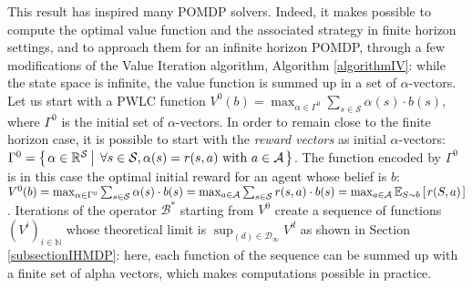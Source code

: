 This result has inspired many POMDP solvers.
Indeed, it makes possible to compute the optimal value function and the associated strategy
in finite horizon settings, and to approach them for an infinite horizon POMDP,
through a few modifications of the Value Iteration algorithm, Algorithm \ref{algorithmIV}: 
while the state space is infinite, the value function is summed up in a set of $\alpha$-vectors.
Let us start with a PWLC function $V^0(b)= \displaystyle\max_{\alpha \in \Gamma^0} \sum_{s \in \mathcal{S}} \alpha(s) \cdot b(s)$,
where $\Gamma^0$ is the initial set of $\alpha$-vectors.
In order to remain close to the finite horizon case,
it is possible to start with the \textit{reward vectors} as initial $\alpha$-vectors:
$\Gamma^0 = \left\{ \left.  \alpha \in \mathbb{R}^{\mathcal{S}} \, \right| \left. \, \forall s \in \mathcal{S}, \alpha(s) = r(s,a) \mbox{ with } a \in \mathcal{A}  \right. \right\}$.
The function encoded by $\Gamma^0$ is in this case the optimal initial reward 
for an agent whose belief is $b$:
$V^0(b) 
= \max_{\alpha \in \Gamma^0} \sum_{s \in \mathcal{S}} \alpha(s) \cdot b(s) 
= \max_{a \in \mathcal{A}} \sum_{s \in \mathcal{S}} r(s,a) \cdot b(s) 
= \max_{a \in \mathcal{A}} \mathbb{E}_{S \sim b} \left[ \left.  r(S,a)  \right. \right]$.
Iterations of the operator $\mathcal{B}^*$ starting from $V^0$
create a sequence of functions $(V^i)_{i \in \mathbb{N}}$ 
whose theoretical limit is  $\sup_{(d) \in \mathcal{D}_{\infty} } V^{d}$
as shown in Section 
\ref{subsectionIHMDP}:
here, each function of the sequence can be summed up 
with a finite set of alpha vectors,
which makes computations possible in practice.


